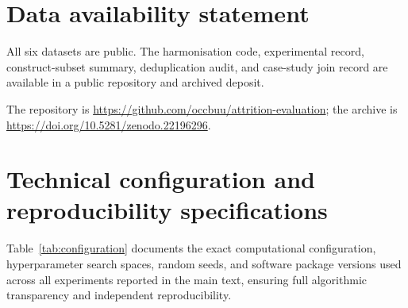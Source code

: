\documentclass[12pt,a4paper]{article}
\newif\ifanonymous
\begin{document}
\section*{Data availability statement}
All six datasets are public. The harmonisation code, experimental record, construct-subset summary, deduplication audit, and case-study join record are available in a public repository and archived deposit.
\ifanonymous
Repository and archive identifiers are withheld from the reviewer-facing manuscript to preserve anonymity and are included in the separate editorial title-page file.
\else
The repository is \url{https://github.com/occbuu/attrition-evaluation}; the archive is \url{https://doi.org/10.5281/zenodo.22196296}.
\fi

\clearpage
\printbibliography[title={References}]

\clearpage
\appendix
{}
\renewcommand{\theHtable}{appendix.\arabic{table}}
\section{Technical configuration and reproducibility specifications}
\label{app:technical}
Table~\ref{tab:configuration} documents the exact computational configuration, hyperparameter search spaces, random seeds, and software package versions used across all experiments reported in the main text, ensuring full algorithmic transparency and independent reproducibility.
\end{document}
